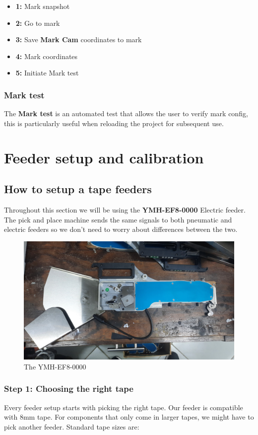 \documentclass[a4paper,10pt]{report}
\begin{document}
\begin{itemize}
 \item \textbf{1: } Mark snapshot
 \item \textbf{2: } Go to mark
 \item \textbf{3: } Save \textbf{Mark Cam} coordinates to mark
 \item \textbf{4: } Mark coordinates
 \item \textbf{5: } Initiate Mark test
\end{itemize}

\subsubsection{Mark test}
The \textbf{Mark test} is an automated test that allows the user to verify mark config, this is particularly useful when reloading the project for subsequent use.
\newpage
\section{Feeder setup and calibration}
\subsection{How to setup a tape feeders}
Throughout this section we will be using the \textbf{YMH-EF8-0000} Electric feeder. The pick and place machine sends the same signals to both pneumatic and electric feeders so we don't need to worry about differences between the two.
\begin{figure}[!htb]
 \centering
 \includegraphics[width=1\textwidth]{feeder.jpg}
 \caption{The YMH-EF8-0000}
\end{figure}
\newpage
\subsubsection{Step 1: Choosing the right tape}
Every feeder setup starts with picking the right tape. Our feeder is compatible with 8mm tape. For components that only come in larger tapes, we might have to pick another feeder. Standard tape sizes are:
\end{document}
